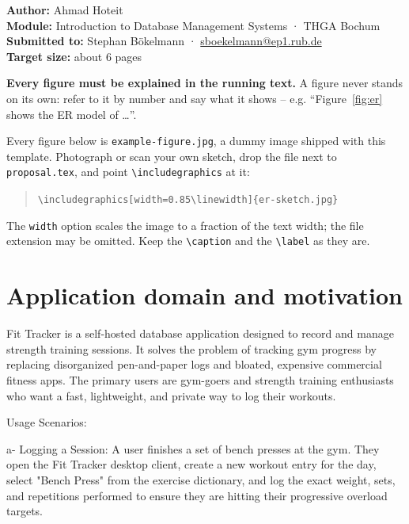 \documentclass[11pt,a4paper]{article}
\newcommand{\authorName}{Ahmad Hoteit}
\newcommand{\projectTitle}{Fit Tracker}
\begin{document}
\thispagestyle{empty}
\thgaTitel{Term Project – Proposal}{\projectTitle}

\begin{infobox}
\textbf{Author:} \authorName \\
\textbf{Module:} Introduction to Database Management Systems · THGA Bochum \\
\textbf{Submitted to:} Stephan Bökelmann · \href{mailto:sboekelmann@ep1.rub.de}{sboekelmann@ep1.rub.de} \\
\textbf{Target size:} about 6 pages
\end{infobox}

\begin{infobox}
\textbf{Every figure must be explained in the running text.} A figure never
stands on its own: refer to it by number and say what it shows -- e.g.
``Figure~\ref{fig:er} shows the ER model of \dots''.

Every figure below is \texttt{example-figure.jpg}, a dummy image shipped with
this template. Photograph or scan your own sketch, drop the file next to
\texttt{proposal.tex}, and point \texttt{\textbackslash includegraphics} at it:
\begin{quote}
\texttt{\textbackslash includegraphics[width=0.85\textbackslash linewidth]\{er-sketch.jpg\}}
\end{quote}
The \texttt{width} option scales the image to a fraction of the text width; the
file extension may be omitted. Keep the \texttt{\textbackslash caption} and the
\texttt{\textbackslash label} as they are.
\end{infobox}

\section{Application domain and motivation}
Fit Tracker is a self-hosted database application designed to record and manage strength training sessions. It solves the problem of tracking gym progress by replacing disorganized pen-and-paper logs and bloated, expensive commercial fitness apps. The primary users are gym-goers and strength training enthusiasts who want a fast, lightweight, and private way to log their workouts.

Usage Scenarios:

a- Logging a Session: A user finishes a set of bench presses at the gym. They open the Fit 
Tracker desktop client, create a new workout entry for the day, select "Bench Press" from the exercise dictionary, and log the exact weight, sets, and repetitions performed to ensure they are hitting their progressive overload targets.
\end{document}
